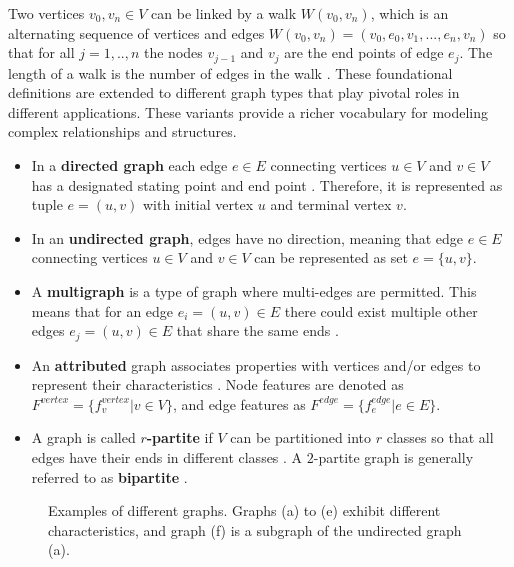 Two vertices $v_0, v_n \in V$ can be linked by a walk $W(v_0, v_n)$, which is an alternating sequence of vertices and edges $W(v_0, v_n)=(v_0, e_0, v_1, ..., e_n, v_n)$ so that for all $j=1,..,n$ the nodes $v_{j-1}$ and $v_j$ are the end points of edge $e_j$. The length of a walk is the number of edges in the walk \cite{diestel_graph_2017}.
These foundational definitions are extended to different graph types that play pivotal roles in different applications. These variants provide a richer vocabulary for modeling complex relationships and structures.

\begin{itemize}
    \item In a \textbf{directed graph} each edge $e \in E$ connecting vertices $u \in V$ and $v \in V$ has a designated stating point and end point \cite{diestel_graph_2017}. Therefore, it is represented as tuple $e = (u, v)$ with initial vertex $u$ and terminal vertex $v$. 
    \item In an \textbf{undirected graph}, edges have no direction, meaning that edge $e \in E$ connecting vertices $u \in V$ and $v \in V$ can be represented as set $e = \{u, v\}$.
    \item A \textbf{multigraph} is a type of graph where multi-edges are permitted. This means that for an edge $e_i = (u,v) \in E$ there could exist multiple other edges $e_j = (u,v) \in E$ that share the same ends \cite{kazemi_representation_2019}.
    \item An \textbf{attributed} graph associates properties with vertices and/or edges to represent their characteristics \cite{kazemi_representation_2019}. Node features are denoted as $F^{vertex} = \{f^{vertex}_v | v \in V\}$, and edge features as $F^{edge} = \{f^{edge}_e | e \in E\}$. 
    \item A graph is called \textbf{$r$-partite} if $V$ can be partitioned into $r$ classes so that all edges have their ends in different classes \cite{diestel_graph_2017}. A $2$-partite graph is generally referred to as \textbf{bipartite} \cite{diestel_graph_2017}.
\end{itemize}

\begin{figure}[h]
        
    \caption{Examples of different graphs. Graphs (a) to (e) exhibit different characteristics, and graph (f) is a subgraph of the undirected graph (a).}
    \label{f_graphs}
\end{figure}

